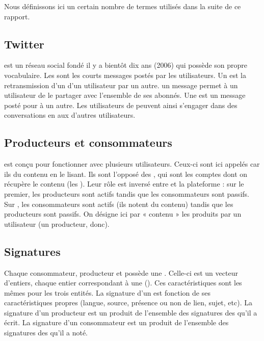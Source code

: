 Nous définissons ici un certain nombre de termes utilisés dans la suite de ce
rapport.

\subsection{Twitter}

\twt{} est un réseau social fondé il y a bientôt dix ans (2006) qui possède son
propre vocabulaire. Les \I{\tweets{}} sont les courts messages postés par les
utilisateurs. Un \I{\rt{}} est la retransmission d’un \tweet{} d’un utilisateur
par un autre.  un message permet à un utilisateur de le partager
avec l’ensemble de ses abonnés. Une  est un message posté pour
 à un autre. Les utilisateurs de \twt{} peuvent ainsi s’engager
dans des conversations en  aux \tweets{} d’autres utilisateurs.

\subsection{Producteurs et consommateurs}

\tb{} est conçu pour fonctionner avec plusieurs utilisateurs. Ceux-ci sont ici
appelés  car ils  du contenu en le lisant. Ils
sont l’opposé des , qui sont les comptes \twt{} dont on récupère
le contenu (les \tweets{}). Leur rôle est inversé entre \twt{} et la plateforme
\tb{} : sur le premier, les producteurs sont actifs tandis que les
consommateurs sont passifs. Sur \tb{}, les consommateurs sont actifs (ils
notent du contenu) tandis que les producteurs sont passifs. On désigne ici par
« contenu » les \I{\tweets{}} produits par un utilisateur (un producteur,
donc).

\subsection{Signatures}

Chaque consommateur, producteur et \tweet{} possède une . Celle-ci
est un vecteur d’entiers, chaque entier correspondant à une 
(). Ces caractéristiques sont les mêmes pour les trois entités. La
signature d’un \tweet{} est fonction de ses caractéristiques propres (langue,
source, présence ou non de lien, sujet, etc). La signature d’un producteur est
un produit de l’ensemble des signatures des \tweets{} qu’il a écrit. La
signature d’un consommateur est un produit de l’ensemble des signatures des
\tweets{} qu’il a noté.
